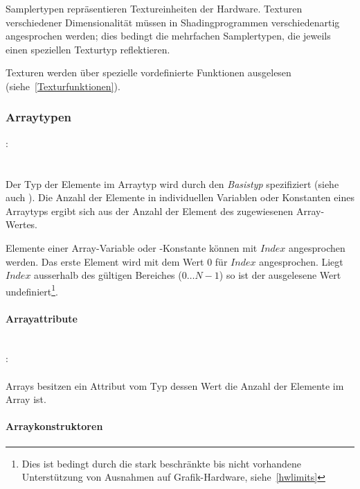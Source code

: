 Samplertypen repräsentieren Textureinheiten der Hardware. Texturen verschiedener
Dimensionalität müssen in Shadingprogrammen verschiedenartig angesprochen werden;
dies bedingt die mehrfachen Samplertypen, die jeweils einen speziellen Texturtyp
reflektieren.

Texturen werden über spezielle vordefinierte Funktionen ausgelesen (siehe~\ref{Texturfunktionen}).


\subsubsection{Arraytypen}\label{Arraytypen}
:\label{typ_array}\\
\hspace*{1cm}\glq\Gt{[}\grq  \glq\Gt{]}\grq \\
\hspace*{1cm}\glq\Gt{[}\grq  \glq\Gt{]}\grq {} \\

Der Typ der Elemente im Arraytyp wird durch den \emph{Basistyp} spezifiziert (siehe auch ).
Die Anzahl der Elemente in individuellen Variablen oder Konstanten eines Arraytyps
ergibt sich aus der Anzahl der Element des zugewiesenen Array-Wertes.

Elemente einer Array-Variable oder -Konstante können mit \ident{Bezeichner[}$\mathit{Index}$\ident{]} angesprochen
werden. Das erste Element wird mit dem Wert $0$ für $\mathit{Index}$ angesprochen.
Liegt $\mathit{Index}$ ausserhalb des gültigen Bereiches ($0\dots{}N-1$) so ist der ausgelesene Wert
undefiniert\footnote{Dies ist bedingt durch die stark beschränkte bis nicht vorhandene Unterstützung von Ausnahmen
auf Grafik-Hardware, siehe~\ref{hwlimits}}.


\paragraph{Arrayattribute}\label{Arrayattribute}
~\\
:\label{attr_array}\\
\hspace*{1cm}\glq{}\grq \\

Arrays besitzen ein Attribut  vom Typ  dessen Wert
die Anzahl der Elemente im Array ist.


\paragraph{Arraykonstruktoren}\label{Arraykonstruktoren}


